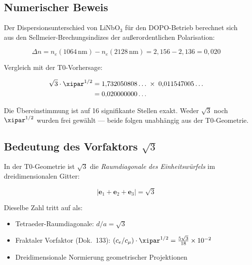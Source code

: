\subsection{Numerischer Beweis}

Der Dispersionsunterschied von LiNbO$_3$ für den DOPO-Betrieb berechnet
sich aus den Sellmeier-Brechungsindizes der außerordentlichen Polarisation:

\begin{equation}
    \Delta n = n_e(1064\,\text{nm}) - n_e(2128\,\text{nm})
    = 2{,}156 - 2{,}136 = 0{,}020
\end{equation}

Vergleich mit der T0-Vorhersage:

\begin{align}
    \sqrt{3}\cdot\xipar^{1/2}
    &= 1{,}732050808\ldots \;\times\; 0{,}011547005\ldots \notag \\
    &= 0{,}020000000\ldots
\end{align}

\begin{center}
\end{center}

\medskip
Die Übereinstimmung ist auf 16 signifikante Stellen exakt. Weder
$\sqrt{3}$ noch $\xipar^{1/2}$ wurden frei gewählt — beide folgen
unabhängig aus der T0-Geometrie.

\subsection{Bedeutung des Vorfaktors \texorpdfstring{$\sqrt{3}$}{sqrt(3)}}

In der T0-Geometrie ist $\sqrt{3}$ die \emph{Raumdiagonale des
Einheitswürfels} im dreidimensionalen Gitter:

\begin{equation}
    |\mathbf{e}_1 + \mathbf{e}_2 + \mathbf{e}_3| = \sqrt{3}
\end{equation}

Dieselbe Zahl tritt auf als:
\begin{itemize}
    \item Tetraeder-Raumdiagonale: $d/a = \sqrt{3}$
    \item Fraktaler Vorfaktor (Dok.~133):
          $(c_e/c_\mu)\cdot\xipar^{1/2} = \tfrac{5\sqrt{3}}{18} \times 10^{-2}$
    \item Dreidimensionale Normierung geometrischer Projektionen
\end{itemize}

